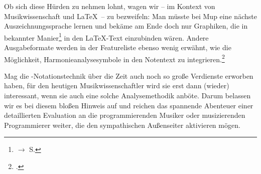 Ob sich diese Hürden zu nehmen lohnt, wagen wir -- im Kontext von
Musikwissenschaft und \LaTeX\ -- zu bezweifeln: Man müsste bei Mup eine nächste
Auszeichnungssprache lernen und bekäme am Ende doch nur Graphiken, die in
bekannter Manier\footnote{$\rightarrow$ S.\pageref{IncludeGraphics}} in den
\LaTeX-Text einzubinden wären. Andere Ausgabeformate werden in der Featureliste
ebenso wenig erwähnt, wie die Möglichkeit, Harmonieanalysesymbole in den
Notentext zu integrieren.\footcite[vgl.][\nopage wp]{Arkka2017d}

Mag die -Notationstechnik über die Zeit auch noch so große Verdienste
erworben haben, für den heutigen Musikwissenschaftler wird sie erst dann
(wieder) interessant, wenn sie auch eine solche Analysemethodik anböte. Darum
belassen wir es bei diesem bloßen Hinweis auf  und reichen das
spannende Abenteuer einer detaillierten Evaluation an die programmierenden
Musiker oder musizierenden Programmierer weiter, die den sympathischen
Außenseiter aktivieren mögen.

%
